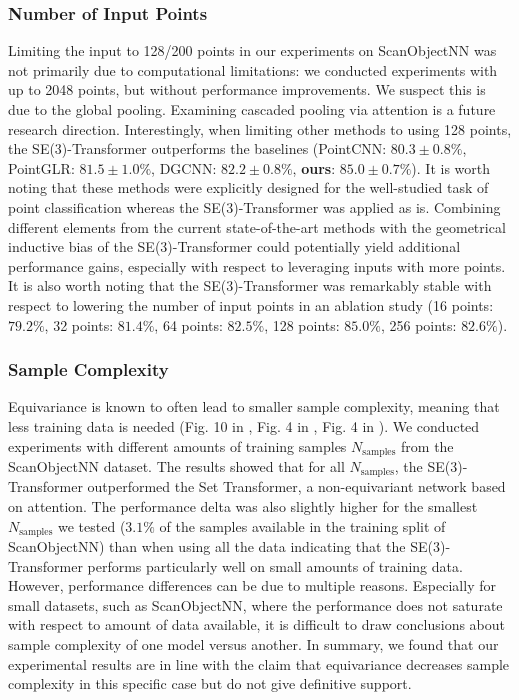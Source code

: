\subsubsection{Number of Input Points}
\label{sec:app_n_points}
Limiting the input to 128/200 points in our experiments on ScanObjectNN was not primarily due to computational limitations: we conducted experiments with up to 2048 points, but without performance improvements. We suspect this is due to the global pooling. Examining cascaded pooling via attention is a future research direction. Interestingly, when limiting other methods to using 128 points, the SE(3)-Transformer outperforms the baselines (PointCNN: $80.3\pm 0.8\%$, PointGLR: $81.5 \pm 1.0\%$, DGCNN: $82.2\pm0.8\%$, \textbf{ours}: $85.0\pm 0.7\%$). It is worth noting that these methods were explicitly designed for the well-studied task of point classification whereas the SE(3)-Transformer was applied as is. Combining different elements from the current state-of-the-art methods with the geometrical inductive bias of the SE(3)-Transformer could potentially yield additional performance gains, especially with respect to leveraging inputs with more points. It is also worth noting that the SE(3)-Transformer was remarkably stable with respect to lowering the number of input points in an ablation study (16 points: $79.2\%$, 32 points: $81.4\%$, 64 points: $82.5\%$, 128 points: $85.0\%$, 256 points: $82.6\%$).

\subsubsection{Sample Complexity}
Equivariance is known to often lead to smaller sample complexity, meaning that less training data is needed (Fig. 10 in \citet{WorrallGRB2016}, Fig. 4 in \citet{WinkelsCohen}, Fig. 4 in \citet{WeilerGWBC18}). We conducted experiments with different amounts of training samples $N_{\text{samples}}$ from the ScanObjectNN dataset. The results showed that for all $N_{\text{samples}}$, the SE(3)-Transformer outperformed the Set Transformer, a non-equivariant network based on attention. The performance delta was also slightly higher for the smallest $N_{\text{samples}}$ we tested ($3.1\%$ of the samples available in the training split of ScanObjectNN) than when using all the data indicating that the SE(3)-Transformer performs particularly well on small amounts of training data. However, performance differences can be due to multiple reasons. Especially for small datasets, such as ScanObjectNN, where the performance does not saturate with respect to amount of data available, it is difficult to draw conclusions about sample complexity of one model versus another. In summary, we found that our experimental results are in line with the claim that equivariance decreases sample complexity in this specific case but do not give definitive support.

